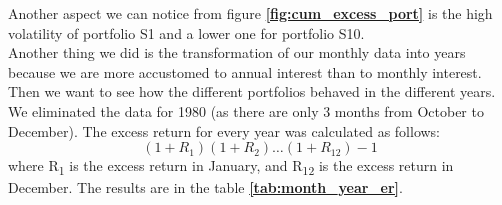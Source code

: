 \documentclass[11pt]{article}
\begin{document}
Another aspect we can notice from figure \textbf{\ref{fig:cum_excess_port}} is the high volatility of portfolio S1 and a lower one for portfolio S10.\\
Another thing we did is the transformation of our monthly data into years because we are more accustomed to annual interest than to monthly interest. 
Then we want to see how the different portfolios behaved in the different years. We eliminated the data for 1980 (as there are only 3 months from October to December). 
The excess return for every year was calculated as follows:
\begin{equation}
    (1 + R_1)(1 + R_2)\hdots(1 + R_{12}) - 1
\end{equation}
where R\textsubscript{1} is the excess return in January, and R\textsubscript{12} is the excess return in December.
The results are in the table \textbf{\ref{tab:month_year_er}}.
\end{document}
